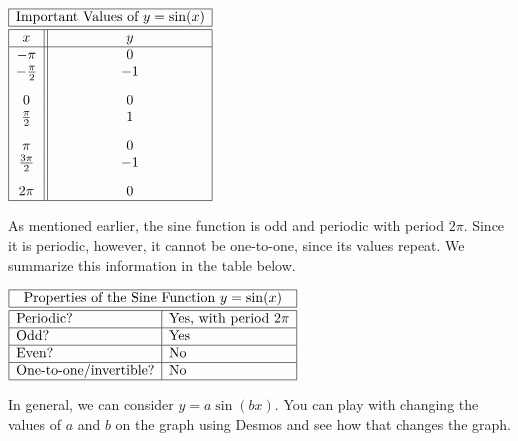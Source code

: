 \documentclass[nooutcomes]{ximera}
\begin{document}
\begin{center}
\(
\begin{array}{ |c || c|  }
 \hline
 \multicolumn{2}{|c|}{\text{\normalfont Important Values of } y=\sin(x)} \\
\hline
 \hline
 x & y\\
 \hline

 -\pi&0\\

 -\frac{\pi}{2}&-1\\[2ex]

 0&0\\

 \frac{\pi}{2}&1\\[2ex]

 \pi&0\\

\frac{3\pi}{2}&-1\\[2ex]

 2 \pi&0\\
\hline
\end{array}
\)
\end{center}

As mentioned earlier, the sine function is odd and periodic with period $2\pi$. Since it is periodic, however, it cannot be one-to-one, since its values repeat. We summarize this information in the table below.

\begin{center}
$
\begin{array}{|l|l|}
 \hline
 \multicolumn{2}{|c|}{\text{\normalfont Properties of the Sine Function } y=\sin(x)} \\
\hline
 \hline
\text{Periodic?} & \text{Yes, with period }2\pi \\ \hline
\text{Odd?} & \text{Yes} \\ \hline
\text{Even?} & \text{No} \\ \hline
\text{One-to-one/invertible?} & \text{No} \\ \hline
\end{array}
$
\end{center}

In general, we can consider $y=a\sin(bx)$.  You can play with changing the values of $a$ and $b$ on the graph using Desmos and see how that changes the graph.  

\begin{center}  
\end{center}



\newpage
\end{document}
